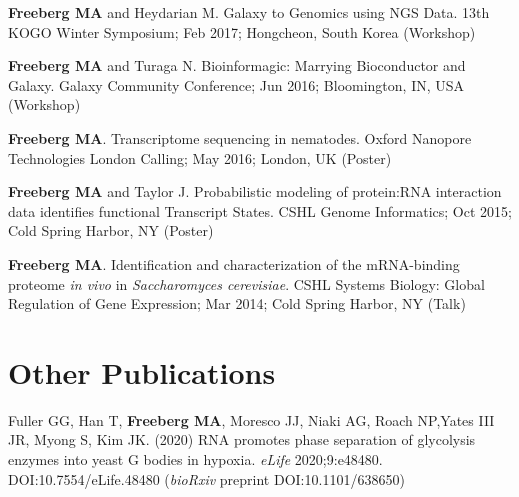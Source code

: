 \documentclass[margin,line]{res}
\begin{document}
\begin{resume}
{\bf Freeberg MA} and Heydarian M. Galaxy to Genomics using NGS Data. 13th KOGO Winter Symposium; Feb 2017; Hongcheon, South Korea (Workshop)


{\bf Freeberg MA} and Turaga N. Bioinformagic: Marrying Bioconductor and Galaxy. Galaxy Community Conference; Jun 2016; Bloomington, IN, USA (Workshop)

{\bf Freeberg MA}. Transcriptome sequencing in nematodes. Oxford Nanopore Technologies London Calling; May 2016; London, UK (Poster)

{\bf Freeberg MA} and Taylor J. Probabilistic modeling of protein:RNA interaction data identifies functional Transcript States. CSHL Genome Informatics; Oct 2015; Cold Spring Harbor, NY (Poster)

{\bf Freeberg MA}. Identification and characterization of the mRNA-binding proteome {\em in vivo} in {\em Saccharomyces cerevisiae}. CSHL Systems Biology: Global Regulation of Gene Expression; Mar 2014; Cold Spring Harbor, NY (Talk)





\section{\sc Other Publications}

Fuller GG, Han T, {\bf Freeberg MA}, Moresco JJ, Niaki AG, Roach NP,Yates III JR, Myong S, Kim JK. (2020) RNA promotes phase separation of glycolysis enzymes into yeast G bodies in hypoxia. {\em eLife} 2020;9:e48480. DOI:10.7554/eLife.48480 ({\em bioRxiv} preprint DOI:10.1101/638650)


\end{resume}
\end{document}
